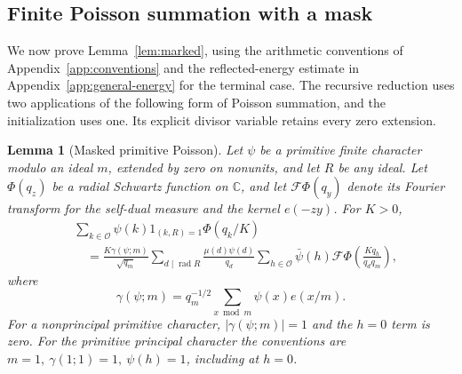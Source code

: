 \documentclass[12pt]{article}
\newtheorem{lemma}[theorem]{Lemma}
\begin{document}
\subsection{Finite Poisson summation with a mask}

We now prove Lemma~\ref{lem:marked}, using the arithmetic conventions of
Appendix~\ref{app:conventions} and the reflected-energy estimate in Appendix~\ref{app:general-energy} for the
terminal case.  The recursive reduction uses two applications of the
following form of Poisson summation, and the initialization uses one.
Its explicit divisor variable retains every zero extension.

\begin{lemma}[Masked primitive Poisson]\label{lem:masked-poisson}
Let \(\psi\) be a primitive finite character modulo an ideal \(m\),
extended by zero on nonunits, and let \(R\) be any ideal.  Let
\(\Phi(q_z)\) be a radial Schwartz function on \(\mathbb C\), and
let \(\mathcal F\Phi(q_y)\) denote its Fourier transform for the
self-dual measure and the kernel \(e(-zy)\).  For \(K>0\),
\begin{equation}\label{eq:masked-poisson}
 \begin{split}
 &\sum_{k\in\mathcal O}\psi(k)1_{(k,R)=1}\Phi(q_k/K)\\
 &\quad=\frac{K\gamma(\psi;m)}{\sqrt{q_m}}
 \sum_{d\mid\operatorname{rad}R}\frac{\mu(d)\psi(d)}{q_d}
 \sum_{h\in\mathcal O}\bar\psi(h)
       \mathcal F\Phi\!\left(\frac{Kq_h}{q_dq_m}\right),
 \end{split}
\end{equation}
where
\[
 \gamma(\psi;m)=q_m^{-1/2}\sum_{x\bmod m}\psi(x)e(x/m).
\]
For a nonprincipal primitive character, \(|\gamma(\psi;m)|=1\) and the
\(h=0\) term is zero.  For the primitive principal character the
conventions are \(m=1,\ \gamma(1;1)=1,\ \psi(h)=1\), including at
\(h=0\).
\end{lemma}
\end{document}

